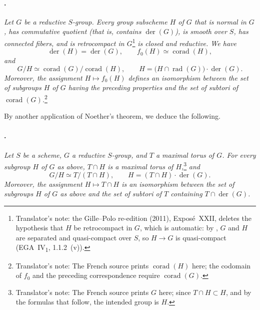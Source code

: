 \paragraph{.}
\textit{Let \(G\) be a reductive \(S\)-group. Every group
subscheme \(H\) of \(G\) that is normal in \(G\), has commutative
quotient \textup{(that is, contains
\(\operatorname{der}(G)\))}, is smooth over \(S\), has connected
fibers, and is retrocompact in \(G\)}\footnote{Translator's note: the Gille--Polo re-edition (2011), Exposé~XXII, deletes the
hypothesis that \(H\) be retrocompact in \(G\), which is automatic: by
, \(G\) and \(H\) are separated and quasi-compact over \(S\),
so \(H\to G\) is quasi-compact (EGA~IV\textsubscript{1}, 1.1.2~(v)).}
\textit{is closed and reductive. We have}
\[
  \operatorname{der}(H)=\operatorname{der}(G),
  \qquad
  f_0(H)\simeq\operatorname{corad}(H),
\]
\textit{and}
\[
  G/H\simeq
  \operatorname{corad}(G)/\operatorname{corad}(H),
  \qquad
  H=
  \bigl(H\cap\operatorname{rad}(G)\bigr)
  \cdot\operatorname{der}(G).
\]
\textit{Moreover, the assignment \(H\mapsto f_0(H)\) defines an
isomorphism between the set of subgroups \(H\) of \(G\) having the
preceding properties and the set of subtori of
\(\operatorname{corad}(G)\).}\footnote{Translator's note: The French
source prints \(\operatorname{corad}(H)\) here; the codomain of
\(f_0\) and the preceding correspondence require
\(\operatorname{corad}(G)\).}

By another application of Noether's theorem, we deduce the following.

\paragraph{.}
\textit{Let \(S\) be a scheme, \(G\) a reductive \(S\)-group, and
\(T\) a maximal torus of \(G\). For every subgroup \(H\) of \(G\)
as above, \(T\cap H\) is a maximal torus of
\(H\),}\footnote{Translator's note: The French source prints \(G\)
here; since \(T\cap H\subset H\), and by the formulas that follow,
the intended group is \(H\).}
\textit{and}
\[
  G/H\simeq T/(T\cap H),
  \qquad
  H=(T\cap H)\cdot\operatorname{der}(G).
\]
\textit{Moreover, the assignment \(H\mapsto T\cap H\) is an
isomorphism between the set of subgroups \(H\) of \(G\) as above
and the set of subtori of \(T\) containing
\(T\cap\operatorname{der}(G)\).}


